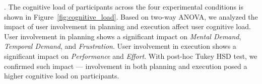 
. The cognitive load of participants across the four experimental conditions is shown in Figure~\ref{fig:cognitive_load}. 
Based on two-way ANOVA, we analyzed the impact of user involvement in planning and execution affect user cognitive load. 
User involvement in planning shows a significant impact on \textit{Mental Demand}, \textit{Temporal Demand}, and \textit{Frustration}. User involvement in execution shows a significant impact on \textit{Performance} and \textit{Effort}. 
With post-hoc Tukey HSD test, we confirmed such impact --- involvement in both planning and execution  posed a higher cognitive load on participants.


